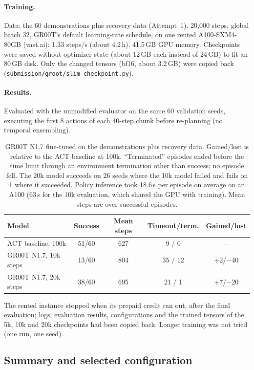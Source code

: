 \documentclass[11pt,a4paper]{article}
\begin{document}
\paragraph{Training.} Data: the 60 demonstrations plus recovery data
(Attempt~1). 20{,}000 steps, global batch 32,
GR00T's default learning-rate schedule, on one rented A100-SXM4-80GB
(vast.ai): 1.33 steps/s (about 4.2\,h), 41.5\,GB GPU memory.
Checkpoints were saved without optimizer state (about 12\,GB each instead of
24\,GB) to fit an 80\,GB disk. Only the changed tensors (bf16, about
3.2\,GB) were copied back
(\texttt{submission/groot/slim\_checkpoint.py}).

\paragraph{Results.} Evaluated with the unmodified evaluator on the same 60
validation seeds, executing the first 8 actions of each 40-step chunk before
re-planning (no temporal ensembling).

\begin{table}[h]
\centering
\begin{tabular}{lcccc}
\toprule
Model & Success & Mean steps & Timeout/term. & Gained/lost \\
\midrule
ACT baseline, 100k & 51/60 & 627 & 9 / 0 & -- \\
GR00T N1.7, 10k steps & 13/60 & 804 & 35 / 12 & +2/$-$40 \\
GR00T N1.7, 20k steps & 38/60 & 695 & 21 / 1 & +7/$-$20 \\
\bottomrule
\end{tabular}
\caption{GR00T N1.7 fine-tuned on the demonstrations plus recovery data. Gained/lost is relative to
the ACT baseline at 100k. ``Terminated'' episodes ended before the time
limit through an environment termination other than success; no episode
fell. The 20k model succeeds on 26 seeds where the 10k model failed and
fails on 1 where it succeeded. Policy inference took 18.6\,s per episode on
average on an A100 (63\,s for the 10k evaluation, which shared the GPU with
training). Mean steps are over successful episodes.}
\label{tab:groot}
\end{table}

The rented instance stopped when its prepaid credit ran out, after the final
evaluation; logs, evaluation results, configurations and the trained tensors
of the 5k, 10k and 20k checkpoints had been copied back. Longer training was
not tried (one run, one seed).

\subsection{Summary and selected configuration}
\label{sec:selected}
\end{document}
